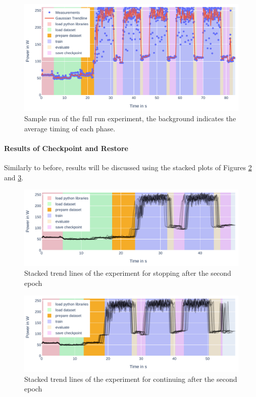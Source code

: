 \begin{figure}[H]
    \includegraphics[width=\linewidth]{power-measurements/measurements_roberta_full_0714010405/plot.pdf}
    \caption{Sample run of the full run experiment, the background indicates the average timing of each phase.}
    \label{fig:plot_full}
\end{figure}

\newpage
\paragraph{Results of Checkpoint and Restore}

Similarly to before, results will be discussed using the stacked plots of Figures \ref{fig:plot_partial_saved_stacked} and \ref{fig:plot_partial_saved_continue_stacked}.

\begin{figure}[H]
    \includegraphics[width=\linewidth]{power-measurements/stacked_plots/roberta_stop_after_saving.pdf}
    \caption{Stacked trend lines of the experiment for stopping after the second epoch}
    \label{fig:plot_partial_saved_stacked}
\end{figure}

\begin{figure}[H]
    \includegraphics[width=\linewidth]{power-measurements/stacked_plots/roberta_continue_after_saving.pdf}
    \caption{Stacked trend lines of the experiment for continuing after the second epoch}
    \label{fig:plot_partial_saved_continue_stacked}
\end{figure}

